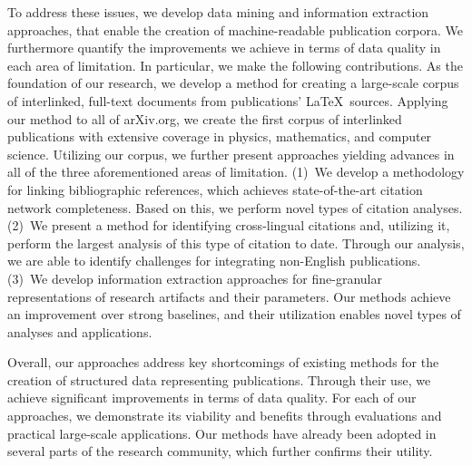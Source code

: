To address these issues, we develop %
data mining and information extraction approaches, that enable the creation of machine-readable publication corpora.
We furthermore quantify the improvements we achieve in terms of data quality in each area of limitation.
%
In particular, we make the following contributions.
As the foundation of our research, we develop a method for creating a large-scale corpus of interlinked, full-text documents from publications' \LaTeX\ sources.
Applying our method to all of arXiv.org, we create the first corpus of interlinked publications with extensive %
coverage in physics, mathematics, and computer science.  %
Utilizing our corpus, we further present approaches yielding advances in all of the three aforementioned areas of limitation.
(1)~We develop a methodology for linking bibliographic references, which achieves state-of-the-art citation network completeness. Based on this, we perform novel types of citation analyses.
(2)~We present a method for identifying cross-lingual citations and, utilizing it, perform the largest analysis of this type of citation to date. Through our analysis, we are able to identify challenges for integrating non-English publications.
(3)~We develop information extraction approaches for fine-granular representations of research artifacts and their parameters.
Our methods achieve an improvement over strong baselines, and their utilization enables novel types of analyses and applications.


Overall, our approaches address key shortcomings of existing methods for the creation of structured data representing publications.
Through their use, we achieve significant improvements in terms of data quality.
For each of our approaches, we demonstrate its viability and benefits through evaluations and practical large-scale applications.
Our methods have already been adopted in several parts of the research community, which further confirms their utility.
